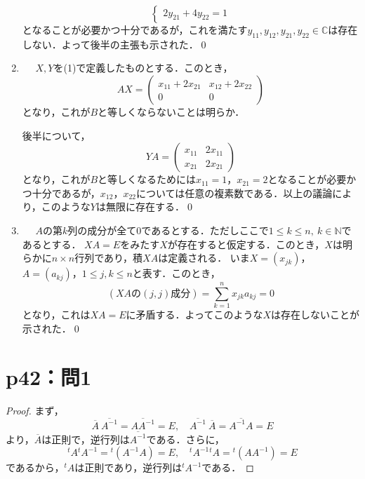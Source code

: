 \documentclass[a4paper,10pt,fleqn]{ltjsarticle}
\begin{document}
\begin{tleftbar}
\begin{enumerate}
\[\begin{cases}
                      2y_{21}+4y_{22} =1
                  \end{cases}
              \]
              となることが必要かつ十分であるが，これを満たす$y_{11},y_{12},y_{21},y_{22} \in \mathbb{C}$は存在しない．よって後半の主張も示された．\qed
        \item \mbox{　}
              $X,Y$を(1)で定義したものとする．このとき，
              \[
                  AX = \begin{pmatrix} x_{11}+2x_{21} & x_{12}+2x_{22} \\ 0 & 0 \end{pmatrix}
              \]
              となり，これが$B$と等しくならないことは明らか．\par
              後半について，
              \[
                  YA =\begin{pmatrix} x_{11} & 2 x_{11} \\  x_{21}&  2x_{21} \end{pmatrix}
              \]
              となり，これが$B$と等しくなるためには$x_{11}=1$，$x_{21}=2$となることが必要かつ十分であるが，$x_{12}$，$x_{22}$については任意の複素数である．以上の議論により，このような$Y$は無限に存在する．\qed
        \item  \mbox{　}
              $A$の第$k$列の成分が全て$0$であるとする．ただしここで$ 1 \le k \le n,~ k \in \mathbb{N}$であるとする．
              $XA=E$をみたす$X$が存在すると仮定する．このとき，$X$は明らかに$n \times n$行列であり，積$XA$は定義される．
              いま$X=(x_{jk})$，$A=(a_{kj})$，$ 1 \le j ,k \le n$と表す．このとき，
              \[
                  (XA \text{の}(j,j)\text{成分}) = \sum_{k=1}^{n} x_{jk} a_{kj} =0
              \]
              となり，これは$XA =E$に矛盾する．よってこのような$X$は存在しないことが示された．\qed
    \end{enumerate}
\end{tleftbar}


\section*{p42：問1}

\begin{leftbar}
    \begin{proof}
        まず，
        \[
            \overline{A} \ \overline{A^{-1}} = \overline{A A^{-1}}=E,\quad \overline{A^{-1}} \ \overline{A} =\overline{A^{-1} A}=E
        \]
        より，$\overline{A}$は正則で，逆行列は$\overline{A^{-1}}$である．さらに，
        \[
            {}^t A {}^t A^{-1} ={}^t (A^{-1} A)=E,\quad {}^t A^{-1} {}^t A = {}^t (A A^{-1})=E
        \]
        であるから，${}^t A$は正則であり，逆行列は${}^t A^{-1}$である．
    \end{proof}
\end{leftbar}
\end{document}
